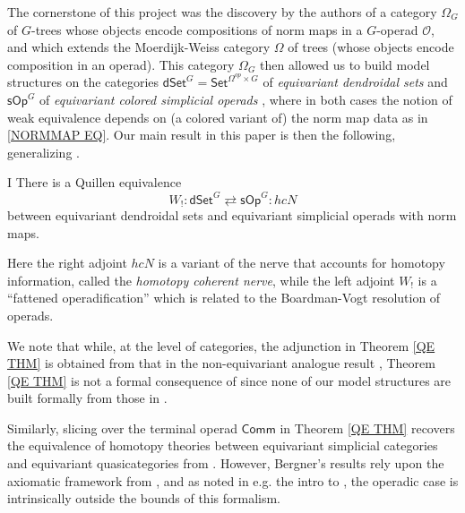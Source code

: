 \documentclass[a4paper,10pt]{article}%
\numberwithin{equation}{section}
\numberwithin{figure}{section}
\theoremstyle{definition} %
\newcommand{\sOp}{\ensuremath{\mathsf{sOp}}}%
\newcommand{\dSet}{\mathsf{dSet}}
\renewcommand{\O}{\ensuremath{\mathcal O}}
\newcommand{\1}{\ensuremath{\mathbbm 1}}%
\begin{document}
The cornerstone of this project was the discovery by the authors of 
a category $\Omega_G$ of $G$-trees 
whose objects encode compositions of norm maps
in a $G$-operad $\O$,
and which extends the Moerdijk-Weiss category $\Omega$
of trees (whose objects encode composition in an operad).
This category $\Omega_G$
then allowed us to build model structures
on the categories
$\mathsf{dSet}^G = \mathsf{Set}^{\Omega^{op} \times G}$
of \emph{equivariant dendroidal sets}
\cite{Per18}
and 
$\mathsf{sOp}^G$
of 
\emph{equivariant colored simplicial operads}
\cite{BP_HGOP},
where in both cases the notion of weak equivalence
depends on (a colored variant of) the norm map data as in 
\eqref{NORMMAP EQ}.
Our main result in this paper is then the following,
generalizing \cite[Thm. 8.15]{CM13b}.
\begin{customthm}{I}\label{QE THM}
	There is a Quillen equivalence
	\begin{equation}
	\label{QE_EQ}
	W_! \colon \dSet^G \rightleftarrows \sOp^G \colon hcN
	\end{equation}
	between equivariant dendroidal sets and
	equivariant simplicial operads with norm maps.
\end{customthm}
Here the right adjoint $hcN$
is a variant of the nerve that accounts for homotopy information,
called the \emph{homotopy coherent nerve},
while the left adjoint $W_!$
is a ``fattened operadification'' 
which is related to the Boardman-Vogt resolution of operads.

We note that while, at the level of categories,
the adjunction in Theorem \ref{QE THM}
is obtained from that in the non-equivariant analogue result
\cite[Thm. 8.15]{CM13b},
Theorem \ref{QE THM} is not a formal consequence of 
\cite[Thm. 8.15]{CM13b}
since none of our model structures 
are built formally from those in \cite[Thm. 8.15]{CM13b}.

Similarly, slicing over the terminal operad $\mathsf{Comm}$ in 
Theorem \ref{QE THM} recovers the equivalence of homotopy theories between
equivariant simplicial categories and equivariant quasicategories from \cite{Ber17}.
However, Bergner's results rely upon the axiomatic framework from \cite{Ste16},
and as noted in e.g. the intro to \cite{BP_HGOP},
the operadic case is intrinsically outside the bounds of this formalism.
\end{document}
